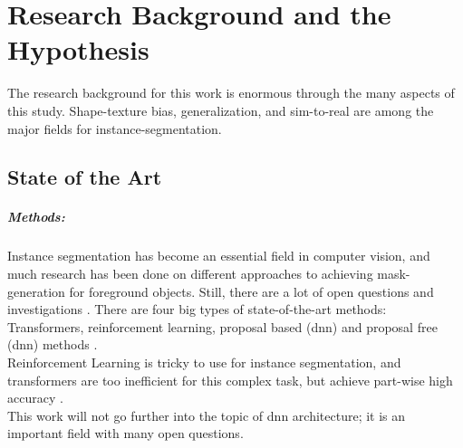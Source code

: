 
\chapter{Research Background and the Hypothesis}
\label{chap:kapitel2}

	The research background for this work is enormous through the many aspects of this study. Shape-texture bias, generalization, and sim-to-real are among the major fields for instance-segmentation. 

	\section{State of the Art}
	\label{sec:state-of-the-art}
	
		\paragraph{Methods:} Instance segmentation has become an essential field in computer vision, and much research has been done on different approaches to achieving mask-generation for foreground objects. Still, there are a lot of open questions and investigations \cite{Sharma2022}. There are four big types of state-of-the-art methods: Transformers, reinforcement learning, proposal based (\ac{dnn}) and proposal free (\ac{dnn}) methods \cite{Sharma2022}.\\
		Reinforcement Learning is tricky to use for instance segmentation, and transformers are too inefficient for this complex task, but achieve part-wise high accuracy \cite{Sharma2022}.\\
		This work will not go further into the topic of \ac{dnn} architecture; it is an important field with many open questions.
